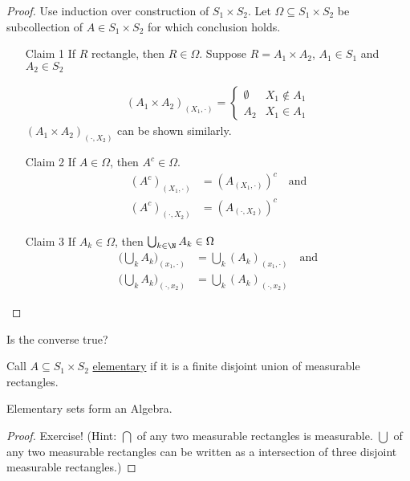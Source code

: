 \begin{proof}
	Use induction over construction of $S_1 \times S_2$.
	Let $\Omega \subseteq S_1 \times S_2$ be subcollection of $A \in S_1 \times S_2$ for which conclusion holds.

	 \begin{enumerate}
		 \item[Claim 1] If $R$ rectangle, then $R \in \Omega$. Suppose  $R = A_1 \times A_2$, $A_1 \in S_1$ and $A_2 \in S_2$

			 \begin{align*}
				 (A_1 \times A_2)_{(X_1, \cdot)} =
				 \begin{cases}
					 \emptyset & X_1 \notin A_1 \\
					 A_2 & X_1 \in A_1
				 \end{cases}
			 \end{align*}
			 $(A_1 \times A_2)_{(\cdot, X_2)}$ can be shown similarly.
		 \item[Claim 2] If $A \in \Omega$, then  $A^c \in \Omega$.
			 \begin{align*}
				 (A^c)_{(X_1, \cdot)} &= (A_{(X_1, \cdot)})^c \quad \text{and} \\
				 (A^c)_{(\cdot, X_2)} &= (A_{(\cdot, X_2)})^c
			 \end{align*}

		 \item[Claim 3] If $A_k \in \Omega$, then  $\bigcup_{k \in \N} A_k \in \Omega$
			 \begin{align*}
				 \big(\bigcup_{k}A_k\big)_{(x_1, \cdot)} &= \bigcup_{k}(A_k)_{(x_1, \cdot)} \quad \text{and} \\
				 \big(\bigcup_{k}A_k\big)_{(\cdot, x_2)} &= \bigcup_{k}(A_k)_{(\cdot, x_2)}
			 \end{align*}

	\end{enumerate}
\end{proof}

\begin{exercise}
	Is the converse true?
\end{exercise}

\begin{definition}
	Call $A \subseteq S_1 \times S_2$ \underline{elementary} if it is a finite disjoint union of measurable rectangles.
\end{definition}

\begin{lemma}
	Elementary sets form an Algebra.
\end{lemma}
\begin{proof}
	Exercise! (Hint: $\bigcap$ of any two measurable rectangles is measurable.
	$\bigcup$ of any two measurable rectangles can be written as a intersection of three disjoint measurable rectangles.)
\end{proof}

